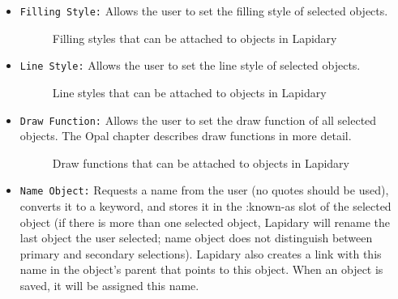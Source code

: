 \begin{itemize}
\item 
{}
{\tt Filling Style:} Allows the user to set the filling style of selected
objects.

\begin{figure}
\begin{center}
\end{center}
\caption{Filling styles that can be attached to objects in Lapidary}
\end{figure}


\item {}

{\tt Line Style:} Allows the user to set the line style of selected objects.

\begin{figure}
\begin{center}
\end{center}
\caption{Line styles that can be attached to objects in Lapidary}
\end{figure}


\item {}

{\tt Draw Function:} Allows the user to set the draw
function of all selected objects.  The Opal chapter describes draw
functions in more detail.

\begin{figure}
\begin{center}
 \end{center}
\caption{Draw functions that can be attached to objects in Lapidary}
\end{figure}


\item {}
{\tt Name Object:} Requests a name from the user (no quotes should
be used), converts it to a keyword, and stores it in the :known-as slot
of the selected object (if there is more than one selected object, Lapidary
will rename the last object the user selected; name object does
not distinguish between primary and secondary selections).
Lapidary also creates a link with this name in the object's parent
that points to this object.  When an object is saved, it will be assigned
this name.


\end{itemize}
